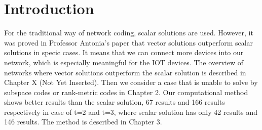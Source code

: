 \chapter{Introduction} \label{chap:introduction}

For the traditional way of network coding, scalar solutions are used. However, it was
proved in Professor Antonia's paper that vector solutions outperform scalar solutions
in specic cases. It means that we can connect more devices into our network, which
is especially meaningful for the IOT devices. The overview of networks where vector
solutions outperform the scalar solution is described in Chapter X (Not Yet Inserted).
Then we consider a case that is unable to solve by subspace codes or rank-metric codes
in Chapter 2. Our computational method shows better results than the scalar solution,
67 results and 166 results respectively in case of t=2 and t=3, where scalar solution has
only 42 results and 146 results. The method is described in Chapter 3.


\clearpage
